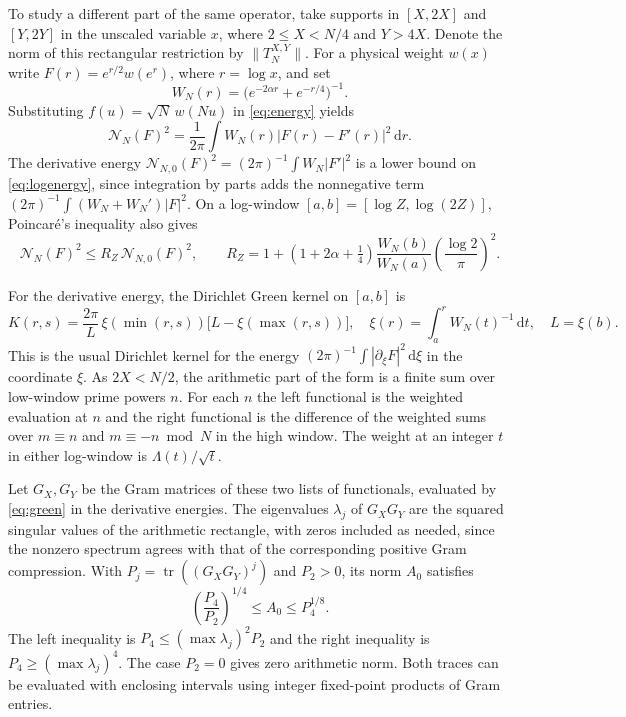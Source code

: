 \documentclass[11pt,a4paper]{article}
\numberwithin{equation}{section}
\newcommand{\ud}{\mathrm d}
\newcommand{\NN}{\mathcal N_N}
\newcommand{\NNzero}{\mathcal N_{N,0}}
\newcommand{\Trect}{T_N^{X,Y}}
\newcommand{\tr}{\operatorname{tr}}
\begin{document}
To study a different part of the same operator, take supports in
$[X,2X]$ and $[Y,2Y]$ in the unscaled variable $x$, where
$2\le X<N/4$ and $Y>4X$. Denote the norm of this rectangular
restriction by $\|\Trect\|$. For a physical weight $w(x)$ write
$F(r)=e^{r/2}w(e^r)$, where $r=\log x$, and set
\[
  W_N(r)=\bigl(e^{-2\alpha r}+e^{-r/4}\bigr)^{-1}.
\]
Substituting $f(u)=\sqrt N\,w(Nu)$ in \cref{eq:energy} yields
\begin{equation}
  \NN(F)^2=\frac1{2\pi}\int W_N(r)|F(r)-F'(r)|^2\,\ud r.
  \label{eq:logenergy}
\end{equation}
The derivative energy $\NNzero(F)^2=(2\pi)^{-1}\int W_N|F'|^2$
is a lower bound on \cref{eq:logenergy}, since integration by parts
adds the nonnegative term $(2\pi)^{-1}\int(W_N+W_N')|F|^2$.
On a log-window $[a,b]=[\log Z,\log(2Z)]$, Poincar\'e's inequality
also gives
\begin{equation}
  \NN(F)^2\le R_Z\,\NNzero(F)^2,\qquad
  R_Z=1+\left(1+2\alpha+\tfrac14\right)
        \frac{W_N(b)}{W_N(a)}\left(\frac{\log 2}{\pi}\right)^2.
  \label{eq:ratio}
\end{equation}

For the derivative energy, the Dirichlet Green kernel on $[a,b]$ is
\begin{equation}
 K(r,s)=\frac{2\pi}{L}\,
          \xi(\min(r,s))\bigl[L-\xi(\max(r,s))\bigr],
 \quad \xi(r)=\int_a^r W_N(t)^{-1}\,\ud t,\quad L=\xi(b).
 \label{eq:green}
\end{equation}
This is the usual Dirichlet kernel for the energy
$(2\pi)^{-1}\int|\partial_\xi F|^2\,\ud\xi$ in the coordinate $\xi$.
As $2X<N/2$, the arithmetic part of the form is a finite sum over
low-window prime powers $n$. For each $n$ the left functional
is the weighted evaluation at $n$ and the right functional is
the difference of the weighted sums over $m\equiv n$ and
$m\equiv -n\bmod N$ in the high window. The weight at an integer
$t$ in either log-window is $\Lambda(t)/\sqrt t$.

Let $G_X,G_Y$ be the Gram matrices of these two lists of
functionals, evaluated by \cref{eq:green} in the derivative
energies. The eigenvalues $\lambda_j$ of $G_XG_Y$ are the squared
singular values of the arithmetic rectangle, with zeros included
as needed, since the nonzero spectrum agrees with that of the
corresponding positive Gram compression. With $P_j=\tr((G_XG_Y)^j)$
and $P_2>0$, its norm $A_0$ satisfies
\begin{equation}
   \left(\frac{P_4}{P_2}\right)^{1/4}
          \le A_0\le P_4^{1/8}.
   \label{eq:traces}
\end{equation}
The left inequality is $P_4\le(\max\lambda_j)^2P_2$ and the right
inequality is $P_4\ge(\max\lambda_j)^4$. The case $P_2=0$ gives zero
arithmetic norm. Both traces can be evaluated with enclosing intervals
using integer fixed-point products of Gram entries.
\end{document}
